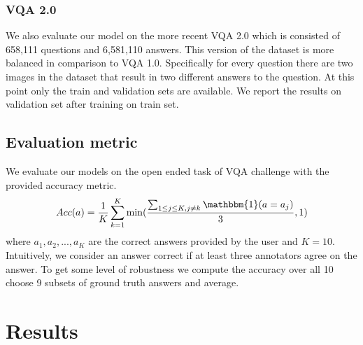 \documentclass[10pt,twocolumn,letterpaper]{article}
\begin{document}
\subsubsection{VQA 2.0}
We also evaluate our model on the more recent VQA 2.0 \cite{Goyal2016MakingTV} which is consisted of 658,111 questions and 6,581,110 answers. This version of the dataset is more balanced in comparison to VQA 1.0. Specifically for every question there are two images in the dataset that result in two different answers to the question. At this point only the train and validation sets are available. We report the results on validation set after training on train set.

\subsection{Evaluation metric}
We evaluate our models on the open ended task of VQA challenge with the provided accuracy metric.
\begin{equation}
Acc(a) = \frac{1}{K} \sum_{k = 1}^{K} \min(\frac{\sum_{1 \leq j \leq K , j \neq k}\mathbbm{1}(a = a_j)}{3}, 1)
\label{eq:accuracy}
\end{equation}
where $a_1, a_2, ..., a_K$ are the correct answers provided by the user and $K = 10$. Intuitively, we consider an answer correct if at least three annotators agree on the answer. To get some level of robustness we compute the accuracy over all 10 choose 9 subsets of ground truth answers and average.

\section{Results}
\end{document}

